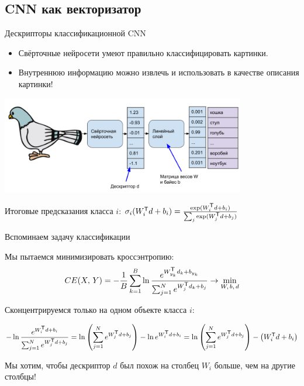 \subsection{CNN как векторизатор}

\begin{frame}{Дескрипторы классификационной CNN}

\begin{itemize}
    \item Свёрточные нейросети умеют правильно классифицировать картинки.
    \item Внутреннюю информацию можно извлечь и использовать в качестве описания картинки!
\end{itemize}

\centering
\includegraphics[width=0.8\textwidth]{images/pigeon CNN.png}

Итоговые предсказания класса $i$: $ \sigma_i(W^{\mathsf{\scriptstyle T}}_i d + b_i) = \frac{\exp ( W^{\mathsf{\scriptstyle T}}_i d + b_i )}{\sum_j \exp ( W^{\mathsf{\scriptstyle T}}_j d + b_j )}$
    
\end{frame}

\begin{frame}{Вспоминаем задачу классификации}

Мы пытаемся минимизировать кроссэнтропию:
\[
CE(X,\,Y) = - \frac{1}{B} \sum_{k=1}^{B} \ln \frac{e^{W_{y_k}^{\mathsf{\scriptstyle T}} d_k + b_{y_k}}}{ \sum_{j=1}^{N} e^{ W_{j}^{\mathsf{\scriptstyle T}} d_k + b_{j} } } \rightarrow \min_{W,\,b,\,d}
\]

Сконцентрируемся только на одном объекте класса $i$:

\[
- \ln \frac{e^{W_{i}^{\mathsf{\scriptstyle T}} d + b_i}}{ \sum_{j=1}^{N} e^{ W_{j}^{\mathsf{\scriptstyle T}} d + b_{j} } } = 
\ln \left( \sum_{j=1}^{N} e^{ W_{j}^{\mathsf{\scriptstyle T}} d + b_{j} } \right) - \ln e^{W_{i}^{\mathsf{\scriptstyle T}} d + b_i} = 
\ln \left( \sum_{j=1}^{N} e^{ W_{j}^{\mathsf{\scriptstyle T}} d + b_{j} } \right) - \left( W_{i}^{\mathsf{\scriptstyle T}} d + b_i \right)
\]

Мы хотим, чтобы дескриптор $d$ был похож на столбец $W_i$ больше, чем на другие столбцы!
    
\end{frame}
